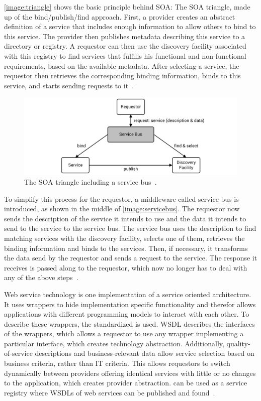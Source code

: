\autoref{image:triangle} shows the basic principle behind SOA: The SOA triangle, made up of the bind/publish/find approach.
First, a provider creates an abstract definition of a service that includes enough information to allow others to bind to this service.
The provider then publishes metadata describing this service to a directory or registry.
A requestor can then use the discovery facility associated with this registry to find services that fulfills his functional and non-functional requirements, based on the available metadata.
After selecting a service, the requestor then retrieves the corresponding binding information, binds to this service, and starts sending requests to it~\autocite{webservices}.

\begin{figure}[!htbp]
	\centering
	\includegraphics[resolution=600]{fundamentals/assets/service_bus}
	\caption{The SOA triangle including a service bus~\autocite[based on][]{webservices}.}
	\label{image:servicebus}
\end{figure}

To simplify this process for the requestor, a middleware called service bus is introduced, as shown in the middle of \autoref{image:servicebus}.
The requestor now sends the description of the service it intends to use and the data it intends to send to the service to the service bus.
The service bus uses the description to find matching services with the discovery facility, selects one of them, retrieves the binding information and binds to the services.
Then, if necessary, it transforms the data send by the requestor and sends a request to the service.
The response it receives is passed along to the requestor, which now no longer has to deal with any of the above steps~\autocite{webservices}.

Web service technology is one implementation of a service oriented architecture.
It uses wrappers to hide implementation specific functionality and therefor allows applications with different programming models to interact with each other.
To describe these wrappers, the standardized  is used.
WSDL describes the interfaces of the wrappers, which allows a requestor to use any wrapper implementing a particular interface, which creates technology abstraction.
Additionally, quality-of-service descriptions and business-relevant data allow service selection based on business criteria, rather than IT criteria.
This allows requestors to switch dynamically between providers offering identical services with little or no changes to the application, which creates provider abstraction.
 can be used as a service registry where WSDLs of web services can be published and found~\autocite{webservices}.

